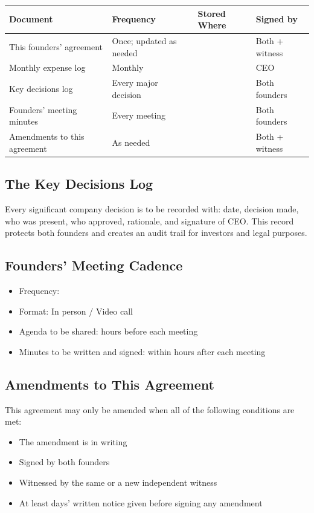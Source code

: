 \documentclass[12pt,a4paper]{article}
\newcommand{\blank}[1][5.5cm]{\underline{\hspace{#1}}}
\begin{document}
\begin{tabularx}{\linewidth}{L{4cm} L{3cm} L{3cm} L{3cm}}
  \toprule
  \textbf{Document} & \textbf{Frequency} & \textbf{Stored Where} & \textbf{Signed by} \\
  \midrule
  This founders' agreement       & Once; updated as needed & \blank[2.5cm] & Both + witness \\[0.4em]
  Monthly expense log            & Monthly                 & \blank[2.5cm] & CEO \\[0.4em]
  Key decisions log              & Every major decision    & \blank[2.5cm] & Both founders \\[0.4em]
  Founders' meeting minutes      & Every meeting           & \blank[2.5cm] & Both founders \\[0.4em]
  Amendments to this agreement   & As needed               & \blank[2.5cm] & Both + witness \\
  \bottomrule
\end{tabularx}

\subsection{The Key Decisions Log}

Every significant company decision is to be recorded with: date, decision made, who was present, who approved, rationale, and signature of CEO. This record protects both founders and creates an audit trail for investors and legal purposes.

\subsection{Founders' Meeting Cadence}

\begin{itemize}
  \item Frequency: \blank[5cm]
  \item Format: \quad In person \;/\; Video call
  \item Agenda to be shared: \blank[1.5cm] hours before each meeting
  \item Minutes to be written and signed: within \blank[1.5cm] hours after each meeting
\end{itemize}

\subsection{Amendments to This Agreement}

This agreement may only be amended when all of the following conditions are met:
\begin{itemize}
  \item The amendment is in writing
  \item Signed by both founders
  \item Witnessed by the same or a new independent witness
  \item At least \blank[1.5cm] days' written notice given before signing any amendment
\end{itemize}
\end{document}
